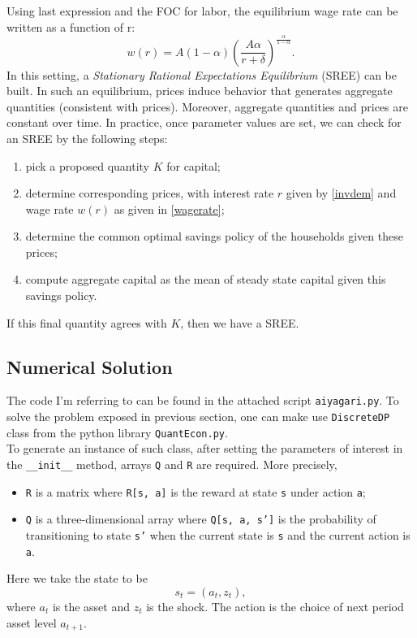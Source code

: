 \documentclass[12pt]{article}
\begin{document}
Using last expression and the FOC for labor, the equilibrium wage rate can be written as a function of r:
\begin{equation}
\label{wagerate}
w(r) = A(1 - \alpha)\left(\frac{A\alpha}{r + \delta} \right)^{\frac{\alpha}{1- \alpha}}.
\end{equation}
In this setting, a \textit{Stationary Rational Expectations Equilibrium} (SREE) can be built. In such an equilibrium, prices induce behavior that generates aggregate quantities (consistent with prices). Moreover, aggregate quantities and prices are constant over time. In practice, once parameter values are set, we can check for an SREE by the following steps:
\begin{enumerate}
\item pick a proposed quantity $K$ for capital;
\item determine corresponding prices, with interest rate $r$ given by \ref{invdem} and wage rate $w(r)$ as given in \ref{wagerate};
\item determine the common optimal savings policy of the households given these prices;
\item compute aggregate capital as the mean of steady state capital given this savings policy.
\end{enumerate}
If this final quantity agrees with $K$, then we have a SREE.
\subsection{Numerical Solution}
The code I'm referring to can be found in the attached script \texttt{aiyagari.py}.
To solve the problem exposed in previous section, one can make use \texttt{DiscreteDP} class from the python library \texttt{QuantEcon.py}. \\
To generate an instance of such class, after setting the parameters of interest in the \texttt{\_\_init\_\_} method, arrays \texttt{Q} and \texttt{R} are required. More precisely,
\begin{itemize}
\item \texttt{R} is a matrix where \texttt{R[s, a]} is the reward at state \texttt{s} under action \texttt{a};
\item \texttt{Q} is a three-dimensional array where \texttt{Q[s, a, s']} is the probability of transitioning to state \texttt{s'} when the current state is \texttt{s} and the current action is \texttt{a}.
\end{itemize}
Here we take the state to be 
\begin{equation}
s_t = \left(a_t, z_t\right),
\end{equation}
where $a_t$ is the asset and $z_t$ is the shock. The action is the choice of next period asset level $a_{t+1}$.
\end{document}

